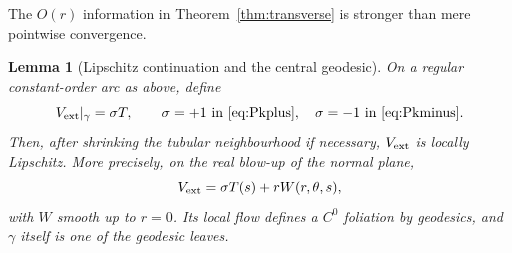 \documentclass[aps,prd,reprint,nofootinbib,superscriptaddress]{revtex4-2}
\newtheorem{lemma}[theorem]{Lemma}
\theoremstyle{definition}
\theoremstyle{remark}
\begin{document}
The $O(r)$ information in Theorem~\ref{thm:transverse} is stronger than mere pointwise convergence.

\begin{lemma}[Lipschitz continuation and the central geodesic]
\label{lem:lipschitz}
On a regular constant-order arc as above, define
\[
V_{\rm ext}|_\gamma=\sigma T,
\qquad \sigma=+1\ \text{in \eqref{eq:Pkplus}},\quad
\sigma=-1\ \text{in \eqref{eq:Pkminus}}.
\]
Then, after shrinking the tubular neighbourhood if necessary, $V_{\rm ext}$ is locally Lipschitz. More precisely, on the real blow-up of the normal plane,
\begin{equation}
V_{\rm ext}=\sigma T(s)+rW(r,\theta,s),
\label{eq:blowupV}
\end{equation}
with $W$ smooth up to $r=0$. Its local flow defines a $C^0$ foliation by geodesics, and $\gamma$ itself is one of the geodesic leaves.
\end{lemma}
\end{document}
